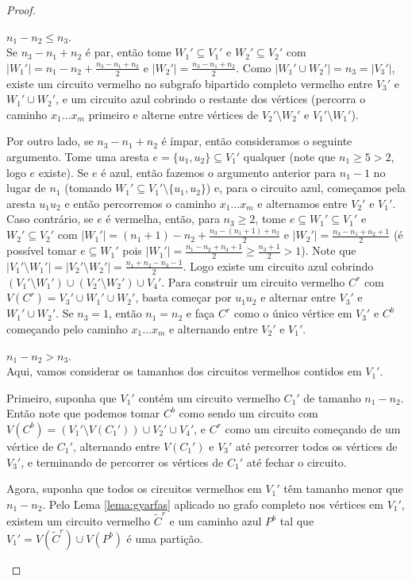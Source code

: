 \begin{proof}
	\begin{caso}
		$n_1 - n_2\leq n_3$.\\		
		Se $n_3 - n_1 + n_2$ é par, então tome $W_1'\subseteq V_1'$ e $W_2'\subseteq V_2'$ com $|W_1'| = n_1 - n_2 + \frac{n_3 - n_1 + n_2}{2}$ e $|W_2'| = \frac{n_3 - n_1 + n_2}{2}$. Como $|W_1'\cup W_2'| = n_3 = |V_3'|$, existe um circuito vermelho no subgrafo bipartido completo vermelho entre $V_3'$ e $W_1'\cup W_2'$, e um circuito azul cobrindo o restante dos vértices (percorra o caminho $x_1\dots x_m$ primeiro e alterne entre vértices de $V_2'\setminus W_2'$ e $V_1'\setminus W_1'$).
		
		Por outro lado, se $n_3 - n_1 + n_2$ é ímpar, então consideramos o seguinte argumento. Tome uma aresta $e = \{u_1, u_2\}\subseteq V_1'$ qualquer (note que $n_1\geq5>2$, logo $e$ existe). Se $e$ é azul, então fazemos o argumento anterior para $n_1-1$ no lugar de $n_1$ (tomando $W_1'\subseteq V_1'\setminus\{u_1, u_2\}$) e, para o circuito azul, começamos pela aresta $u_1u_2$ e então percorremos o caminho $x_1\dots x_m$ e alternamos entre $V_2'$ e $V_1'$.
		Caso contrário, se $e$ é vermelha, então, para $n_3\geq2$, tome $e\subseteq W_1'\subseteq V_1'$ e $W_2'\subseteq V_2'$ com $|W_1'| = (n_1 + 1) - n_2 + \frac{n_3 - (n_1+1) + n_2}{2}$ e $|W_2'| = \frac{n_3 - n_1 + n_2 + 1}{2}$ (é possível tomar $e\subseteq W_1'$ pois $|W_1'| = \frac{n_1 - n_2 + n_3 + 1}{2}\geq \frac{n_3 + 1}{2}>1$). Note que $|V_1'\setminus W_1'| = |V_2'\setminus W_2'| = \frac{n_1 + n_2 - n_3 - 1}{2}$. Logo existe um circuito azul cobrindo $(V_1'\setminus W_1')\cup(V_2'\setminus W_2')\cup V_4'$. Para construir um circuito vermelho $C^r$ com $V(C^r) = V_3'\cup W_1' \cup W_2'$, basta começar por $u_1u_2$ e alternar entre $V_3'$ e $W_1'\cup W_2'$. Se $n_3 = 1$, então $n_1 = n_2$ e faça $C^r$ como o único vértice em $V_3'$ e $C^b$ começando pelo caminho $x_1\dots x_m$ e alternando entre $V_2'$ e $V_1'$.
	\end{caso} 
	\begin{caso}
		$n_1 - n_2 > n_3$.\\
		Aqui, vamos considerar os tamanhos dos circuitos vermelhos contidos em $V_1'$.
		
		Primeiro, suponha que $V_1'$ contém um circuito vermelho $C_1'$ de tamanho $n_1 - n_2$. Então note que podemos tomar $C^b$ como sendo um circuito com $V(C^b) = (V_1'\setminus V(C_1'))\cup V_2'\cup V_4'$, e $C^r$ como um circuito começando de um vértice de $C_1'$, alternando entre $V(C_1')$ e $V_3'$ até percorrer todos os vértices de $V_3'$, e terminando de percorrer os vértices de $C_1'$ até fechar o circuito.
		
		Agora, suponha que todos os circuitos vermelhos em $V_1'$ têm tamanho menor que $n_1 - n_2$. Pelo Lema \ref{lema:gyarfas} aplicado no grafo completo nos vértices em $V_1'$, existem um circuito vermelho $\tilde{C}^r$ e um caminho azul $P^b$ tal que $V_1' = V(\tilde{C}^r)\cup V(P^b)$ é uma partição. 
	\end{caso}
\end{proof}

